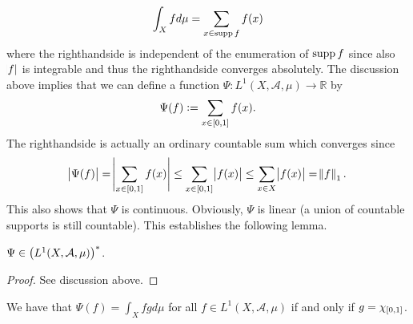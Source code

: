 \begin{enumerate}[label = \textbf{Exercise \arabic*.},wide = 0pt, itemsep = 1.5ex]
\begin{enumerate}[label = \textbf{\alph*.},wide = 0pt, itemsep = 1.5ex]
				\begin{equation*}
					\int_X fd \mu = \sum_{x \in \operatorname{supp} f} f(x)
				\end{equation*}
				\noindent where the righthandside is independent of the enumeration of $\operatorname{supp} f$ since also $\abs{f}$ is integrable and thus the righthandside converges absolutely. The discussion above implies that we can define a function $\Psi : L^1(X,\mathcal{A},\mu) \to \mathbb{R}$ by
				\begin{equation*}
					\Psi(f) := \sum_{x \in \intcc{0,1}} f(x).
				\end{equation*}
				\noindent The righthandside is actually an ordinary countable sum which converges since 
				\begin{equation*}
					\abs{\Psi(f)} = \abs[4]{\sum_{x \in \intcc{0,1}} f(x)} \leq \sum_{x \in \intcc{0,1}} \abs{f(x)} \leq \sum_{x \in X} \abs{f(x)} = \norm{f}_1.
				\end{equation*}
				This also shows that $\Psi$ is continuous. Obviously, $\Psi$ is linear (a union of countable supports is still countable). This establishes the following lemma.

				\begin{lemma}
					$\Psi \in \del[1]{L^1(X,\mathcal{A},\mu)}^*$.
				\end{lemma}

				\begin{proof}
					See discussion above.
				\end{proof}

				\begin{lemma}
					We have that $\Psi(f) = \int_X fg d\mu$ for all $f \in L^1(X,\mathcal{A},\mu)$ if and only if $g = \chi_{\intcc{0,1}}$.
				\end{lemma}


\end{enumerate}
\end{enumerate}
